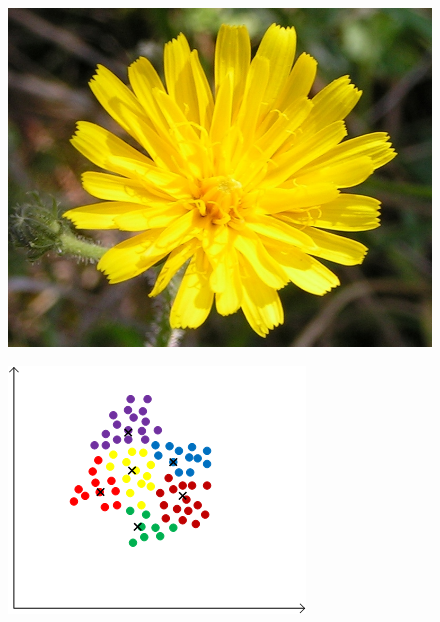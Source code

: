 \documentclass[xcolor=table]{beamer}
\begin{document}
\begin{frame}
\begin{figure}[htbp]
\begin{minipage}[c]{.4\linewidth}
\begin{center}
\includegraphics[scale=0.10]{21604.jpg}
\label{fig:image6}
\end{center}
\end{minipage}
\hfill
\begin{minipage}[c]{.5\linewidth}
\begin{center}
\includegraphics[scale=0.35]{kmeans_img_2.png}
\label{fig:image7}
\end{center}
\end{minipage}
\end{figure}

\end{frame}
\end{document}
